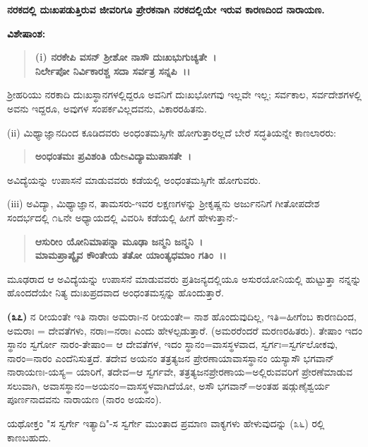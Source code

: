 \begin{center}
\textbf{ನರಕದಲ್ಲಿ ದುಃಖಪಡುತ್ತಿರುವ ಜೀವರಿಗೂ ಪ್ರೇರಕನಾಗಿ ನರಕದಲ್ಲಿಯೇ ಇರುವ ಕಾರಣದಿಂದ ನಾರಾಯಣ.}
\end{center}

\noindent
\textbf{ವಿಶೇಷಾಂಶ:\enginline{-}}

\begin{verse}
\textbf{(i) ನರಕೇಪಿ ವಸನ್ ಶ‍್ರೀಶೋ ನಾಸೌ ದುಃಖಭುಗುಚ್ಯತೇ~।}\\\textbf{ನಿರ್ಲೇಪೋ ನಿರ್ವಿಕಾರಶ್ಚ ಸದಾ ಸರ್ವತ್ರ ಸನ್ನಪಿ~।।}
\end{verse}


ಶ‍್ರೀಹರಿಯು ನರಕಾದಿ ದುಃಖಸ್ಥಾನಗಳಲ್ಲಿದ್ದರೂ ಅವನಿಗೆ ದುಃಖಭೋಗವು ಇಲ್ಲವೇ ಇಲ್ಲ; ಸರ್ವಕಾಲ, ಸರ್ವದೇಶಗಳಲ್ಲಿ ಅವನು ಇದ್ದರೂ, ಅವುಗಳ ಸಂಪರ್ಕವಿಲ್ಲದವನು, ವಿಕಾರರಹಿತನು.

(ii) ಮಿಥ್ಯಾಜ್ಞಾನದಿಂದ ಕೂಡಿದವರು ಅಂಧಂತಮಸ್ಸಿಗೇ ಹೋಗುತ್ತಾರಲ್ಲದೆ ಬೇರೆ ಸದ್ಧತಿಯನ್ನೇ ಕಾಣಲಾರರು:

\begin{verse}
\textbf{ಅಂಧಂತಮಃ ಪ್ರವಿಶಂತಿ ಯೇsವಿದ್ಯಾಮುಪಾಸತೇ~।}
\end{verse}


ಅವಿದ್ಯೆಯನ್ನು ಉಪಾಸನೆ ಮಾಡುವವರು ಕಡೆಯಲ್ಲಿ ಅಂಧಂತಮಸ್ಸಿಗೇ ಹೋಗುವರು.

(iii) ಅವಿದ್ಯಾ, ಮಿಥ್ಯಾಜ್ಞಾನ, ತಾಮಸರು-ಇವರ ಲಕ್ಷಣಗಳನ್ನು ಶ‍್ರೀಕೃಷ್ಣನು ಅರ್ಜುನನಿಗೆ ಗೀತೋಪದೇಶ ಸಂದರ್ಭದಲ್ಲಿ ೧೬ನೇ ಅಧ್ಯಾಯದಲ್ಲಿ ವಿವರಿಸಿ ಕಡೆಯಲ್ಲಿ ಹೀಗೆ ಹೇಳುತ್ತಾನೆ:-

\begin{verse}
\textbf{ಆಸುರೀಂ ಯೋನಿಮಾಪನ್ನಾ ಮೂಢಾ ಜನ್ಮನಿ ಜನ್ಮನಿ~।}\\\textbf{ಮಾಮಪ್ರಾಪ್ಯೈವ ಕೌಂತೇಯ ತತೋ ಯಾಂತ್ಯಧಮಾಂ ಗತಿಂ~।।}
\end{verse}

\noindent
ಮೂಢರಾದ ಆ ಅವಿದ್ಯೆಯನ್ನು ಉಪಾಸನೆ ಮಾಡುವವರು ಪ್ರತಿಜನ್ಯದಲ್ಲಿಯೂ ಅಸುರಯೋನಿಯಲ್ಲಿ ಹುಟ್ಟುತ್ತಾ ನನ್ನನ್ನು ಹೊಂದದೆಯೇ ನಿತ್ಯ ದುಃಖಪ್ರದವಾದ ಅಂಧಂತಮಸ್ಸನ್ನು ಹೊಂದುತ್ತಾರೆ.

\textbf{(೩೭)} ನ ರೀಯಂತೇ ಇತಿ ನಾರಾಃ ಅಮರಾಃ-ನ ರೀಯಂತೇ= ನಾಶ ಹೊಂದುವುದಿಲ್ಲ, ಇತಿ=ಹೀಗೆಂಬ ಕಾರಣದಿಂದ, ಅಮರಾಃ = ದೇವತೆಗಳು, ನರಾಃ=ನರಾಃ ಎಂದು ಹೇಳಲ್ಪಡುತ್ತಾರೆ. (ಅಮರರೆಂದರೆ ಮರಣರಹಿತರು). ತೇಷಾಂ ಇದಂ ಸ್ಥಾನಂ ಸ್ವರ್ಗೋ ನಾರಂ-ತೇಷಾಂ= ಆ ದೇವತೆಗಳ, ಇದಂ ಸ್ಥಾನಂ=ವಾಸಸ್ಥಳವಾದ, ಸ್ವರ್ಗಃ=ಸ್ವರ್ಗಲೋಕವು, ನಾರಂ=ನಾರಂ ಎಂದೆನಿಸುತ್ತದೆ. ತದೇವ ಅಯನಂ ತತ್ರತ್ಯಜನ ಪ್ರೇರಣಾಯಾವಾಸಸ್ಥಾನಂ ಯಸ್ಯಾಸೌ ಭಗವಾನ್ ನಾರಾಯಣಃ-ಯಸ್ಯ= ಯಾರಿಗೆ, ತದೇವ=ಆ ಸ್ವರ್ಗವೇ, ತತ್ರತ್ಯಜನ\-ಪ್ರೇರಣಾಯ=ಅಲ್ಲಿರುವವರಿಗೆ ಪ್ರೇರಣೆಮಾಡುವ ಸಲುವಾಗಿ, ಅವಾಸಸ್ಥಾನಂ=ಅಯನಂ=\break ವಾಸಸ್ಥಳವಾಗಿದೆಯೋ, ಅಸೌ ಭಗವಾನ್=ಅಂತಹ ಷಡ್ಗುಣೈಶ್ವರ್ಯ ಪೂರ್ಣನಾದವನು ನಾರಾಯಣ (ನಾರಂ ಅಯನಂ).

ಯಥೋಕ್ತಂ "ಸ ಸ್ವರ್ಗೇ ಇತ್ಯಾದಿ"-ಸ ಸ್ವರ್ಗೇ ಮುಂತಾದ ಪ್ರಮಾಣ ವಾಕ್ಯಗಳು ಹೇಳುವುದನ್ನು (೩೬) ರಲ್ಲಿ ಕಾಣಬಹುದು.

